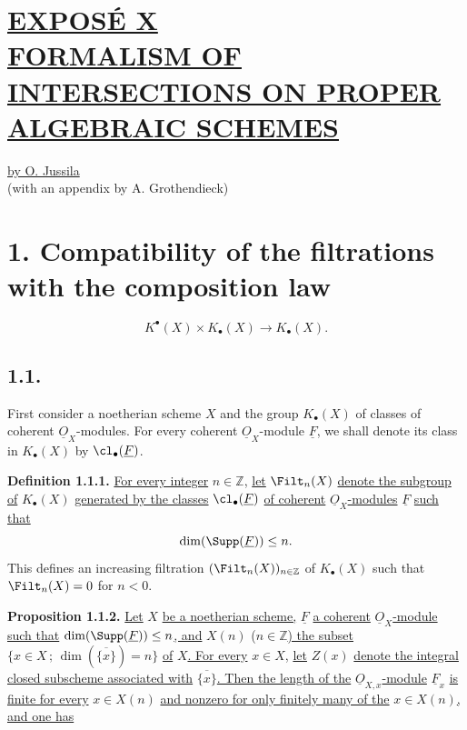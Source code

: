 %

\section*{\underline{EXPOSÉ X}\\[3pt] \underline{\underline{FORMALISM OF INTERSECTIONS ON PROPER ALGEBRAIC SCHEMES}}}
\begin{center}
\underline{by O. Jussila}\\
(with an appendix by A. Grothendieck)
\end{center}

\section*{1. Compatibility of the filtrations with the composition law}
\[
K^{\bullet}(X)\times K_\bullet(X)\longrightarrow K_\bullet(X).
\]

\subsection*{1.1.}
First consider a noetherian scheme $X$ and the group $K_\bullet(X)$ of classes of coherent $\underline{O}_X$-modules. For every coherent $\underline{O}_X$-module $\underline{F}$, we shall denote its class in $K_\bullet(X)$ by $\cl_\bullet(\underline{F})$.

\textbf{Definition 1.1.1.} \uline{For every integer} $n\in\mathbb Z$, \uline{let} $\Filt_n(X)$ \uline{denote the subgroup of} $K_\bullet(X)$ \uline{generated by the classes} $\cl_\bullet(\underline{F})$ \uline{of coherent} $\underline{O}_X$\uline{-modules} $\underline{F}$ \uline{such that}
\[
\dim(\Supp(\underline{F}))\leq n.
\]
This defines an increasing filtration $(\Filt_n(X))_{n\in\mathbb Z}$ of $K_\bullet(X)$ such that $\Filt_n(X)=0$ for $n<0$.

\textbf{Proposition 1.1.2.} \uline{Let} $X$ \uline{be a noetherian scheme,} $\underline{F}$ \uline{a coherent} $\underline{O}_X$\uline{-module such that} $\dim(\Supp(\underline{F}))\leq n$\uline{, and} $X(n)$ ($n\in\mathbb Z$\uline{) the subset} $\{x\in X\,;\,\dim(\overline{\{x\}})=n\}$ \uline{of} $X$\uline{. For every} $x\in X$, \uline{let} $Z(x)$ \uline{denote the integral closed subscheme associated with} $\overline{\{x\}}$\uline{. Then the length of the} $\underline{O}_{X,x}$\uline{-module} $\underline{F}_x$ \uline{is finite for every} $x\in X(n)$ \uline{and nonzero for only finitely many of the} $x\in X(n)$\uline{, and one has}


